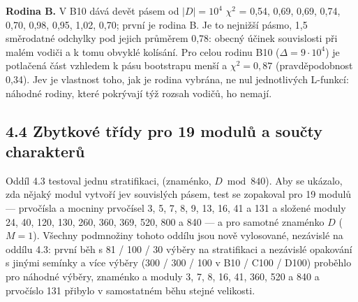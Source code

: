 \documentclass[
  10pt,
]{article}
\begin{document}
\textbf{Rodina B.} V B10 dává devět pásem od \(|D| = 10^4\) \(\chi^2\) =
0,54, 0,69, 0,69, 0,74, 0,70, 0,98, 0,95, 1,02, 0,70; první je rodina B.
Je to nejnižší pásmo, 1,5 směrodatné odchylky pod jejich průměrem 0,78:
obecný účinek souvislosti při malém vodiči a k tomu obvyklé kolísání.
Pro celou rodinu B10 (\(\Delta = 9\cdot10^4\)) je potlačená část
vzhledem k pásu bootstrapu menší a \(\chi^2 = 0{,}87\) (pravděpodobnost
0,34). Jev je vlastnost toho, jak je rodina vybrána, ne nul jednotlivých
L-funkcí: náhodné rodiny, které pokrývají týž rozsah vodičů, ho nemají.

\hypertarget{zbytkovuxe9-tux159uxeddy-pro-19-modulux16f-a-souux10dty-charakterux16f}{%
\subsection{4.4 Zbytkové třídy pro 19 modulů a součty
charakterů}\label{zbytkovuxe9-tux159uxeddy-pro-19-modulux16f-a-souux10dty-charakterux16f}}

Oddíl 4.3 testoval jednu stratifikaci, (znaménko, \(D \bmod 840\)). Aby
se ukázalo, zda nějaký modul vytvoří jev souvislých pásem, test se
zopakoval pro 19 modulů --- prvočísla a mocniny prvočísel 3, 5, 7, 8, 9,
13, 16, 41 a 131 a složené moduly 24, 40, 120, 130, 260, 360, 369, 520,
800 a 840 --- a pro samotné znaménko \(D\) (\(M = 1\)). Všechny
podmnožiny tohoto oddílu jsou nově vylosované, nezávislé na oddílu 4.3:
první běh s 81 / 100 / 30 výběry na stratifikaci a nezávislé opakování s
jinými semínky a více výběry (300 / 300 / 100 v B10 / C100 / D100)
proběhlo pro náhodné výběry, znaménko a moduly 3, 7, 8, 16, 41, 360, 520
a 840 a prvočíslo 131 přibylo v samostatném běhu stejné velikosti.
\end{document}
